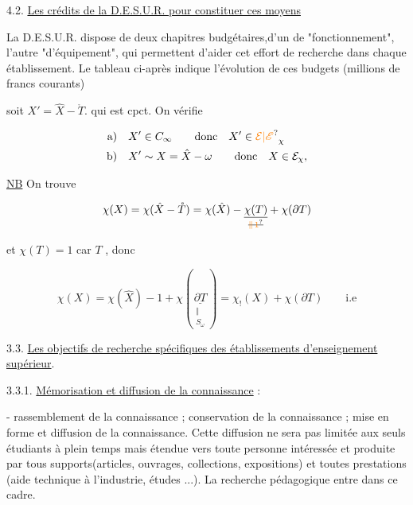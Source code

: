 4.2. \uline{Les crédits de la D.E.S.U.R. pour constituer ces moyens}

La D.E.S.U.R. dispose de deux chapitres budgétaires,d'un de "fonctionnement", l'autre "d'équipement", qui permettent d'aider cet effort de recherche dans chaque établissement. Le tableau ci-après indique l'évolution de ces budgets (millions de francs courants)


soit $X'=\hat X-\mathring T$. qui est cpct.  On vérifie


\[
\begin{aligned}
\text{a)}\quad & X'\in C_\infty \qquad\text{donc}\quad X'\in \unsure{\mathcal E|\mathscr E}_\chi\\
\text{b)}\quad & X'\sim X=\hat X-\omega \qquad\text{donc}\quad X\in\mathcal E_\chi,
\end{aligned}
\]

\uline{NB} On trouve

\[
\chi(X)=\chi(\hat X-\mathring T)=\chi(\hat X)-\underset{\deleted{\unsure{\Vert\,1}}}{\underline{\chi(T)}}+\chi(\partial T)
\]

et $\chi(T)=1$ car $T$ , donc

\[
\chi(X)=\chi(\hat X)-1+\chi(\underset{\substack{\Vert\\ S_\omega}}{\underline{\partial T}})=\chi_!(X)+\chi(\partial T)\qquad\text{i.e}
\]



3.3. \uline{Les objectifs de recherche spécifiques des établissements d'enseignement supérieur}.

3.3.1. \uline{Mémorisation et diffusion de la connaissance} :

- rassemblement de la connaissance ; conservation de la connaissance ; mise en forme et diffusion de la connaissance. Cette diffusion ne sera pas limitée aux seuls étudiants à plein temps mais étendue vers toute personne intéressée et produite par tous supports(articles, ouvrages, collections, expositions) et toutes prestations (aide technique à l'industrie, études ...). La recherche pédagogique entre dans ce cadre.

